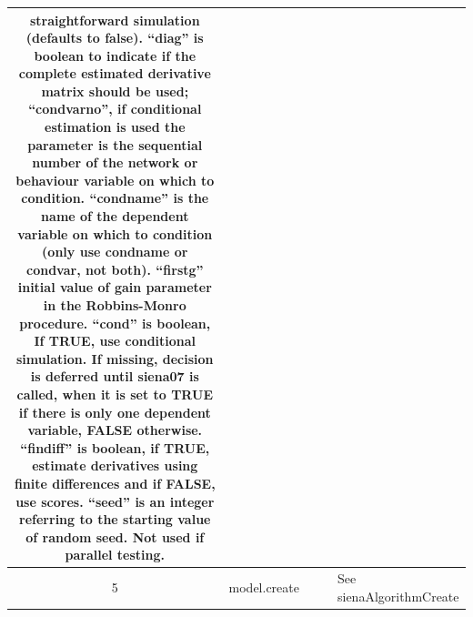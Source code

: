 \documentclass[a4paper,fleqn,11pt]{article}
\newcommand{\+}{\, + \,}
\begin{document}
{\begin{landscape}
\begin{small}
\begin{longtable}{c | p{2.4cm} | p{4.5cm} | p{4.0cm} | p{9.0cm} }
straightforward simulation (defaults to false). ``diag'' is boolean to indicate
if the complete estimated derivative matrix should be used; ``condvarno'', if
conditional estimation is used the parameter is the sequential number of the
network or behaviour variable on which to condition. ``condname'' is the name
of the dependent variable on which to condition (only use condname or condvar,
not both). ``firstg'' initial value of gain parameter in the Robbins-Monro
procedure. ``cond'' is boolean, If TRUE, use conditional simulation. If
missing, decision is deferred until siena07 is called, when it is set to TRUE
if there is only one dependent variable, FALSE otherwise. ``findiff'' is
boolean, if TRUE, estimate derivatives using finite differences and if FALSE,
use scores. ``seed'' is an integer referring to the starting value of random
seed. Not used if parallel
testing.\\
\hline

5   & model.create  & & &       See sienaAlgorithmCreate\\
\hline


\end{longtable}
\end{small}
\end{landscape}}
\end{document}
